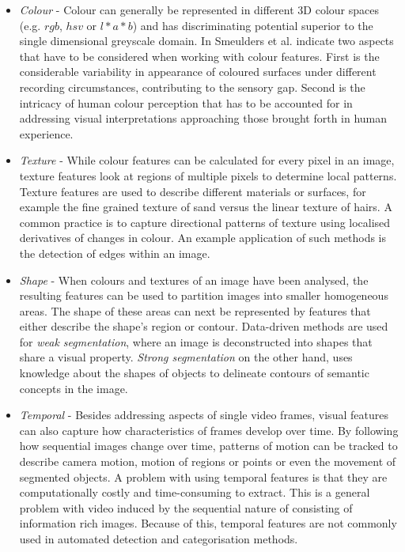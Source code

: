 \begin{itemize}
  \item \emph{Colour} - Colour can generally be represented in different 3D colour spaces (e.g. $rgb$, $hsv$ or $l*a*b$) and has discriminating potential superior to the single dimensional greyscale domain. In \cite{Smeulders:2000tx} Smeulders et al. indicate two aspects that have to be considered when working with colour features. First is the considerable variability in appearance of coloured surfaces under different recording circumstances, contributing to the sensory gap. Second is the intricacy of human colour perception that has to be accounted for in addressing visual interpretations approaching those brought forth in human experience.
  \item \emph{Texture} - While colour features can be calculated for every pixel in an image, texture features look at regions of multiple pixels to determine local patterns. Texture features are used to describe different materials or surfaces, for example the fine grained texture of sand versus the linear texture of hairs. A common practice is to capture directional patterns of texture using localised derivatives of changes in colour\cite{Jain:1991wc}. An example application of such methods is the detection of edges within an image.

  \item \emph{Shape} - When colours and textures of an image have been analysed, the resulting features can be used to partition images into smaller homogeneous areas. The shape of these areas can next be represented by features that either describe the shape's region or contour. Data-driven methods are used for \emph{weak segmentation}, where an image is deconstructed into shapes that share a visual property\cite{Veltkamp:2001vn}.  \emph{Strong segmentation} on the other hand, uses knowledge about the shapes of objects to delineate contours of semantic concepts in the image.

  \item \emph{Temporal} - Besides addressing aspects of single video frames, visual features can also capture how characteristics of frames develop over time. By following how sequential images change over time, patterns of motion can be tracked to describe camera motion\cite{Tonomura:1994vb}, motion of regions or points \cite{Sivic:2006jw} or even the movement of segmented objects\cite{Nguyen:2000vk}. A problem with using temporal features is that they are computationally costly and time-consuming to extract. This is a general problem with video induced by the sequential nature of consisting of information rich images. Because of this, temporal features are not commonly used in automated detection and categorisation methods.

\end{itemize}

